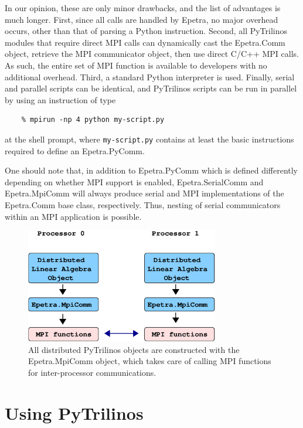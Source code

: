 \documentclass[acmtocl]{acmtrans2m}
\begin{document}
In our opinion, these are only minor drawbacks, and the list of
advantages is much longer. First, since all calls are handled by
Epetra, no major overhead occurs, other than that of parsing a Python
instruction. Second, all PyTrilinos modules that require direct MPI
calls can dynamically cast the Epetra.Comm object, retrieve the MPI
communicator object, then use direct C/C++ MPI calls. As such, the
entire set of MPI function is available to developers with no
additional overhead. Third, a standard Python interpreter is
used. Finally, serial and parallel scripts can be identical, and
PyTrilinos scripts can be run in parallel by using an instruction of
type
\begin{verbatim}
    % mpirun -np 4 python my-script.py
\end{verbatim}
at the shell prompt, where {\tt my-script.py} contains at least the basic
instructions required to define an Epetra.PyComm.

One should note that, in addition to Epetra.PyComm which is defined
differently depending on whether MPI support is enabled,
Epetra.SerialComm and Epetra.MpiComm will always produce serial and
MPI implementations of the Epetra.Comm base class, respectively.
Thus, nesting of serial communicators within an MPI application is
possible.

\begin{figure}
\begin{center}
\includegraphics[height=5cm]{distributed_object.eps}
\caption{All distributed PyTrilinos objects are constructed with the
  Epetra.MpiComm object, which takes care of calling MPI functions for
  inter-processor communications.}
\label{fig:distributed}
\end{center}
\end{figure}


\section{Using PyTrilinos}
\label{sec:using}
\end{document}

